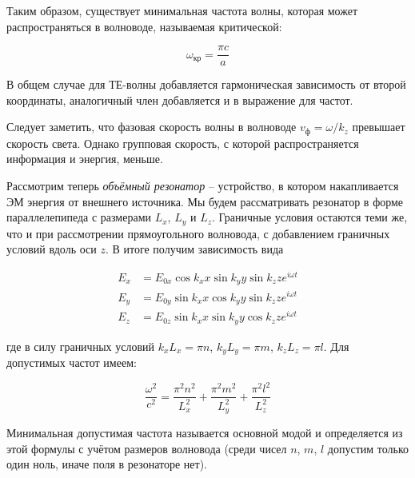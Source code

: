 \noindent
Таким образом, существует минимальная частота волны, которая может распространяться в волноводе, называемая критической:

\begin{equation}
    \omega_\text{кр} = \frac{\pi c}{a}
\end{equation}

\noindent
В общем случае для ТЕ-волны добавляется гармоническая зависимость от второй координаты, аналогичный член добавляется и в выражение для частот.

Следует заметить, что фазовая скорость волны в волноводе $v_\text{ф} = \omega / k_z$ превышает скорость света. Однако групповая скорость, с которой распространяется информация и энергия, меньше.

Рассмотрим теперь \textit{объёмный резонатор} -- устройство, в котором накапливается ЭМ энергия от внешнего источника. Мы будем рассматривать резонатор в форме параллелепипеда с размерами $L_x$, $L_y$ и $L_z$. Граничные условия остаются теми же, что и при рассмотрении прямоугольного волновода, с добавлением граничных условий вдоль оси $z$. В итоге получим зависимость вида

\begin{align}
    E_x &= E_{0 x} \cos k_x x \sin k_y y \sin k_z z e^{i \omega t} \\
    E_y &= E_{0 y} \sin k_x x \cos k_y y \sin k_z z e^{i \omega t} \\
    E_z &= E_{0 z} \sin k_x x \sin k_y y \cos k_z z e^{i \omega t}
\end{align}

\noindent
где в силу граничных условий $k_x L_x = \pi n$, $k_y L_y = \pi m$, $k_z L_z = \pi l$. Для допустимых частот имеем:

\begin{equation}
    \frac{\omega^2}{c^2} = \frac{\pi^2 n^2}{L_x^2} + \frac{\pi^2 m^2}{L_y^2} + \frac{\pi^2 l^2}{L_z^2}
\end{equation}

Минимальная допустимая частота называется основной модой и определяется из этой формулы с учётом размеров волновода (среди чисел $n$, $m$, $l$ допустим только один ноль, иначе поля в резонаторе нет).